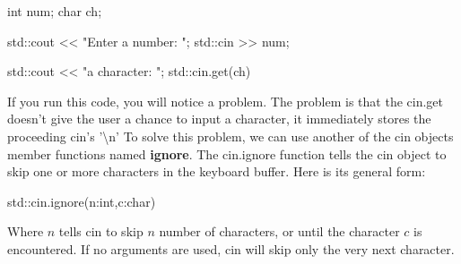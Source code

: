 \documentclass{report}
\begin{document}
    \begin{cppcode}
int num;
char ch;

std::cout << "Enter a number: ";
std::cin >> num;

std::cout << "\nEnter a character: ";
std::cin.get(ch)
    \end{cppcode}
    
    \bigbreak \noindent 
    If you run this code, you will notice a problem. The problem is that the cin.get doesn't give the user a chance to input a character, it immediately stores the proceeding cin's '\textbackslash n'
    \bigbreak \noindent 
    To solve this problem, we can use another of the cin objects member functions named \textbf{ignore}. The cin.ignore function tells the cin object to skip one or more characters in the keyboard buffer. Here is its general form:
    \smallbreak \noindent
    
    \begin{cppcode}
            std::cin.ignore(n:int,c:char)
    \end{cppcode}
    
    \bigbreak \noindent 
    Where $n$ tells cin to skip $n$ number of characters, or until the character $c$ is encountered. If no arguments are used, cin will skip only the very next character.





    \pagebreak \bigbreak \noindent 
\end{document}
